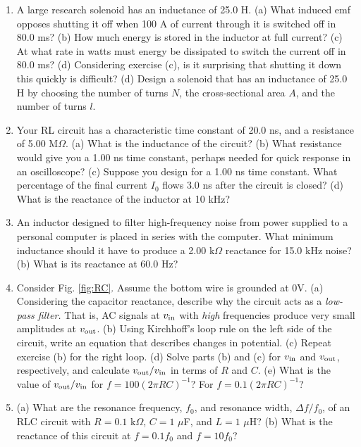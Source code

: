 \documentclass[12pt,twocolumn]{article}
\begin{document}
\begin{enumerate}
\item A large research solenoid has an inductance of 25.0 H. (a) What induced emf opposes shutting it off when 100 A of current through it is switched off in 80.0 ms? (b) How much energy is stored in the inductor at full current? (c) At what rate in watts must energy be dissipated to switch the current off in 80.0 ms? (d) Considering exercise (c), is it surprising that shutting it down this quickly is difficult? (d) Design a solenoid that has an inductance of 25.0 H by choosing the number of turns $N$, the cross-sectional area $A$, and the number of turns $l$. \\ \vspace{4cm}
\item Your RL circuit has a characteristic time constant of 20.0 ns, and a resistance of 5.00 M$\Omega$. (a) What is the inductance of the circuit? (b) What resistance would give you a 1.00 ns time constant, perhaps needed for quick response in an oscilloscope? (c) Suppose you design for a 1.00 ns time constant.  What percentage of the final current $I_0$ flows 3.0 ns after the circuit is closed? (d) What is the reactance of the inductor at 10 kHz? \\ \vspace{2cm}
\item An inductor designed to filter high-frequency noise from power supplied to a personal computer is placed in series with the computer. What minimum inductance should it have to produce a 2.00 k$\Omega$ reactance for 15.0 kHz noise? (b) What is its reactance at 60.0 Hz? \\ \vspace{1.5cm}
\item Consider Fig. \ref{fig:RC}.  Assume the bottom wire is grounded at 0V.  (a) Considering the capacitor reactance, describe why the circuit acts as a \textit{low-pass filter.}  That is, AC signals at $v_{\rm in}$ with \textit{high} frequencies produce very small amplitudes at $v_{\rm out}$. (b) Using Kirchhoff's loop rule on the left side of the circuit, write an equation that describes changes in potential.  (c) Repeat exercise (b) for the right loop.  (d) Solve parts (b) and (c) for $v_{\rm in}$ and $v_{\rm out}$, respectively, and calculate $v_{\rm out}/v_{\rm in}$ in terms of $R$ and $C$.  (e) What is the value of $v_{\rm out}/v_{\rm in}$ for $f = 100(2\pi R C)^{-1}$? For $f = 0.1(2\pi R C)^{-1}$? \\ \vspace{6cm}
\item (a) What are the resonance frequency, $f_0$, and resonance width, $\Delta f/f_0$, of an RLC circuit with $R = 0.1$ k$\Omega$, $C = 1$ $\mu$F, and $L = 1$ $\mu$H? (b) What is the reactance of this circuit at $f = 0.1f_0$ and $f = 10f_0$? \\ \vspace{1.5cm}

\end{enumerate}
\end{document}
